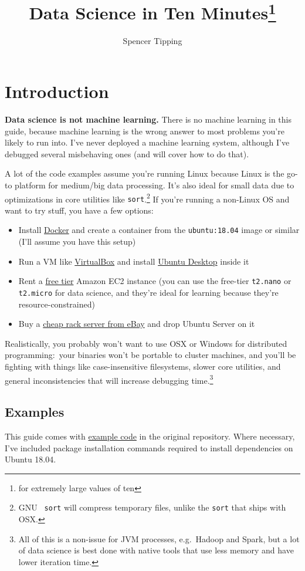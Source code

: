 \documentclass{article}
\title{Data Science in Ten Minutes\footnote{for extremely large values of ten}}
\author{Spencer Tipping}
\newcommand{\lnk}[2]{\href{#1}{\textcolor[rgb]{1.0,0.0,0.0}{#2}}}
\begin{document}
  \maketitle
  \tableofcontents

  \section*{Introduction}
  {\bf Data science is not machine learning.} There is no machine learning in
  this guide, because machine learning is the wrong answer to most problems
  you're likely to run into. I've never deployed a machine learning system,
  although I've debugged several misbehaving ones (and will cover how to do
  that).

  A lot of the code examples assume you're running Linux because Linux is the
  go-to platform for medium/big data processing. It's also ideal for small data
  due to optimizations in core utilities like {\tt sort}.\footnote{GNU {\tt
  sort} will compress temporary files, unlike the {\tt sort} that ships with
  OSX.} If you're running a non-Linux OS and want to try stuff, you have a few
  options:

  \begin{itemize}
    \item Install \lnk{https://docker.com}{Docker} and create a container from
          the {\tt ubuntu:18.04} image or similar (I'll assume you have this
          setup)
    \item Run a VM like \lnk{https://www.virtualbox.org/}{VirtualBox} and
          install \lnk{https://www.ubuntu.com/desktop}{Ubuntu Desktop} inside it
    \item Rent a \lnk{https://aws.amazon.com/free/}{free tier} Amazon EC2
          instance (you can use the free-tier {\tt t2.nano} or {\tt t2.micro}
          for data science, and they're ideal for learning because they're
          resource-constrained)
    \item Buy a
          \lnk{https://github.com/spencertipping/www/blob/master/datacenter.md}{cheap
          rack server from eBay} and drop Ubuntu Server on it
  \end{itemize}

  Realistically, you probably won't want to use OSX or Windows for distributed
  programming:~your binaries won't be portable to cluster machines, and you'll
  be fighting with things like case-insensitive filesystems, slower core
  utilities, and general inconsistencies that will increase debugging
  time.\footnote{All of this is a non-issue for JVM processes, e.g.~Hadoop and
  Spark, but a lot of data science is best done with native tools that use less
  memory and have lower iteration time.}

  \subsection*{Examples}
  This guide comes with
  \lnk{https://github.com/spencertipping/data-science-in-ten-minutes/tree/master/example}{example
  code} in the original repository. Where necessary, I've included package
  installation commands required to install dependencies on Ubuntu 18.04.

  \newpage
  \newpage
\end{document}
